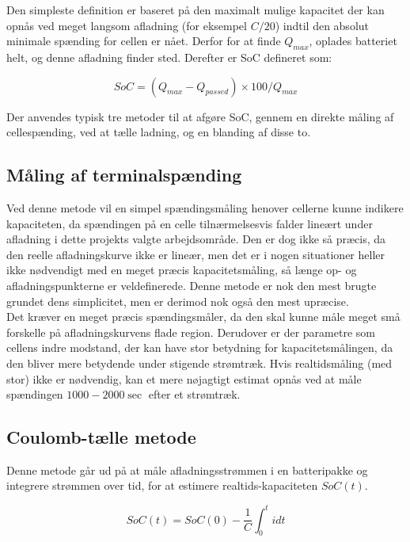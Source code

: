 Den simpleste definition er baseret på den maximalt mulige kapacitet der kan opnås ved meget langsom afladning (for eksempel $C/20$) indtil den absolut minimale spænding for cellen er nået. Derfor for at finde $Q_{max}$, oplades batteriet helt, og denne afladning finder sted. Derefter er SoC defineret som: 

\begin {equation} 
SoC = (Q_{max}-Q_{passed})\times 100/Q_{max} \label{eq:soc}
\end {equation}

Der anvendes typisk tre metoder til at afgøre SoC, gennem en direkte måling af cellespænding, ved at tælle ladning, og en blanding af disse to.

\subsection{Måling af terminalspænding}
Ved denne metode vil en simpel spændingsmåling henover cellerne kunne indikere kapaciteten, da spændingen på en celle tilnærmelsesvis falder lineært under afladning i dette projekts valgte arbejdsområde. Den er dog ikke så præcis, da den reelle afladningskurve ikke er lineær, men det er i nogen situationer heller ikke nødvendigt med en meget præcis kapacitetsmåling, så længe op- og afladningspunkterne er veldefinerede. Denne metode er nok den mest brugte grundet dens simplicitet, men er derimod nok også den mest upræcise. 
\\

Det kræver en meget præcis spændingsmåler, da den skal kunne måle meget små forskelle på afladningskurvens flade region. Derudover er der parametre som cellens indre modstand, der kan have stor betydning for kapacitetsmålingen, da den bliver mere betydende under stigende strømtræk. Hvis realtidsmåling (med stor) ikke er nødvendig, kan et mere nøjagtigt estimat opnås ved at måle spændingen $1000 - 2000 \sec$ efter et strømtræk.


\subsection{Coulomb-tælle metode}
Denne metode går ud på at måle afladningsstrømmen i en batteripakke og integrere strømmen over tid, for at estimere realtids-kapaciteten $SoC(t)$. 

\begin {equation} 
SoC(t) = SoC(0) - \frac{1}{C} \int_{0}^{t} idt  \label{eq:coulomb-count}
\end {equation}

